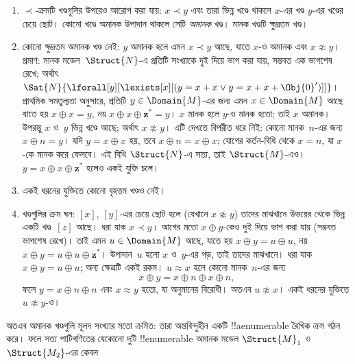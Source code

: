 \documentclass[../../../include/open-logic-section]{subfiles}
\begin{document}
\begin{enumerate}
  $x \prec {^*y}$। অতএব $x \prec y$ ও~$x \not\approx y$ হলে
  প্রত্যেক $w \approx x$ প্রত্যেক $v \approx y$-এর চেয়ে
  $\prec$-ছোট। সেই অনুযায়ী, প্রতিটি অমানক খণ্ড~$[x]$ একটি
  উভয় দিকে অসীম শৃঙ্খল গঠন করে:
  \[
  \cdots \prec  {^{**}x} \prec {^*}x \prec x \prec x^* \prec x^{**}
  \prec \cdots
  \]
  একে $Z$-শৃঙ্খল বলা হয়, কারণ এর ক্রমপ্রকার পূর্ণসংখ্যার ক্রমপ্রকার।
\item $\prec$-ক্রমটি খণ্ডগুলির উপরেও আরোপ করা যায়: $x \prec y$
  এবং তারা ভিন্ন খণ্ডে থাকলে $x$-এর খণ্ড $y$-এর খণ্ডের চেয়ে ছোট।
  কোনো খণ্ডে অমানক উপাদান থাকলে সেটি \emph{অমানক} খণ্ড।
  মানক খণ্ডটি ক্ষুদ্রতম খণ্ড।
\item কোনো ক্ষুদ্রতম অমানক খণ্ড নেই: $y$ অমানক হলে এমন
  $x \prec y$ আছে, যাতে $x$-ও অমানক এবং $x \not\approx y$।
  প্রমাণ: মানক মডেল~$\Struct{N}$-এ প্রতিটি সংখ্যাকে দুই দিয়ে
  ভাগ করা যায়, সম্ভবত এক ভাগশেষ রেখে; অর্থাৎ
  $\Sat{N}{\lforall[y][\lexists[x][(y = x + x \lor y = x + x +
        \Obj{0}')]]}$।
  প্রাথমিক সমতুল্যতা অনুসারে, প্রতিটি $y \in \Domain{M}$-এর জন্য
  এমন $x \in \Domain{M}$ আছে যাতে হয় $x \oplus x = y$,
  নয় $x \oplus x \oplus \mathbf{z}^*= y$। $x$ মানক হলে
  $y$-ও মানক হতো; তাই $x$ অমানক। উপরন্তু $x$ ও~$y$
  ভিন্ন খণ্ডে আছে; অর্থাৎ $x \not\approx y$। এটি দেখতে
  বিপরীত ধরে নিই: কোনো মানক~$n$-এর জন্য $x \oplus n = y$।
  যদি $y=x\oplus x$ হয়, তবে $x\oplus n=x\oplus x$; যোগের
  কর্তন-বিধি থেকে $x=n$, যা $x$-কে মানক করে ফেলবে।
  এই বিধি $\Struct{N}$-এ সত্য, তাই $\Struct{M}$-এও।
  $y=x\oplus x\oplus\mathbf{z}^*$ হলেও একই যুক্তি চলে।
\item একই ধরনের যুক্তিতে কোনো বৃহত্তম খণ্ডও নেই।
\item খণ্ডগুলির ক্রম ঘন: $[x]$, $[y]$-এর চেয়ে ছোট হলে
  (যেখানে $x \not\approx y$) তাদের মাঝখানে উভয়ের থেকে
  ভিন্ন একটি খণ্ড~$[z]$ আছে। ধরা যাক $x\prec y$।
  আগের মতো $x\oplus y$-কেও দুই দিয়ে ভাগ করা যায়
  (সম্ভবত ভাগশেষ রেখে)। তাই এমন $u \in \Domain{M}$ আছে,
  যাতে হয় $x\oplus y=u\oplus u$, নয়
  $x\oplus y=u\oplus u\oplus\mathbf{z}^*$।
  উপাদান~$u$ হলো $x$ ও~$y$-এর গড়, তাই তাদের মাঝখানে।
  ধরা যাক $x\oplus y=u\oplus u$; অন্য ক্ষেত্রটি একই রকম।
  $u\approx x$ হলে কোনো মানক~$n$-এর জন্য
  \[
  x \oplus y = x \oplus n \oplus x \oplus n,
  \]
  ফলে $y=x\oplus n\oplus n$ এবং $x\approx y$ হতো,
  যা অনুমানের বিরোধী। অতএব $u\not\approx x$।
  একই ধরনের যুক্তিতে $u\not\approx y$-ও।
\end{enumerate}
অতএব অমানক খণ্ডগুলি মূলদ সংখ্যার মতো ক্রমিত: তারা অন্তবিন্দুহীন
একটি !!a{enumerable} রৈখিক ক্রম গঠন করে। ফলে সত্য পাটিগণিতের যেকোনো দুটি
!!{enumerable} অমানক মডেল $\Struct{M}_1$ ও~$\Struct{M_2}$-এর কেবল
\end{document}
